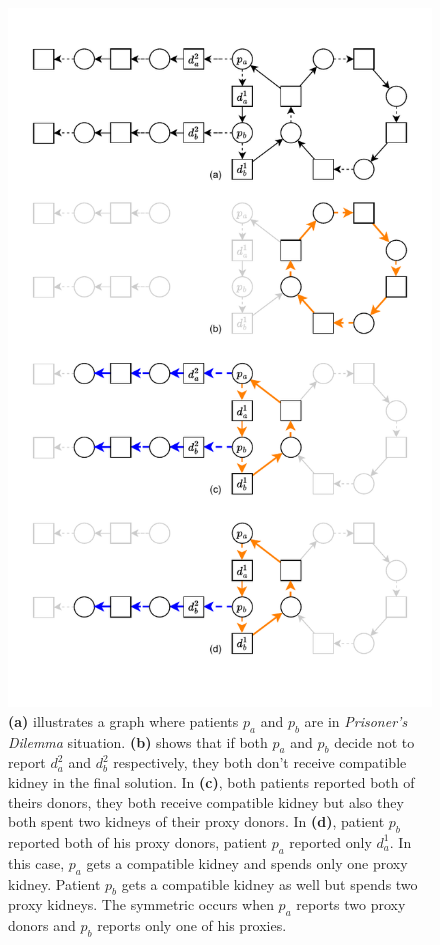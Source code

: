 \begin{figure}
    \centering
    \includegraphics{data/prisoners_dilemma.pdf}
    \caption[Prisoner's dilemma in multiple-donors model]{\textbf{(a)} illustrates a graph where patients $p_a$ and $p_b$ are in \textit{Prisoner's Dilemma} situation. \textbf{(b)} shows that if both $p_a$ and $p_b$ decide not to report $d_a^2$ and $d_b^2$ respectively, they both don't receive compatible kidney in the final solution. In \textbf{(c)}, both patients reported both of theirs donors, they both receive compatible kidney but also they both spent two kidneys of their proxy donors. In \textbf{(d)}, patient $p_b$ reported both of his proxy donors, patient $p_a$ reported only $d_a^1$. In this case, $p_a$ gets a compatible kidney and spends only one proxy kidney. Patient $p_b$ gets a compatible kidney as well but spends two proxy kidneys. The symmetric occurs when $p_a$ reports two proxy donors and $p_b$ reports only one of his proxies.}
    \label{fig:prisoners_dilemma}
\end{figure}


